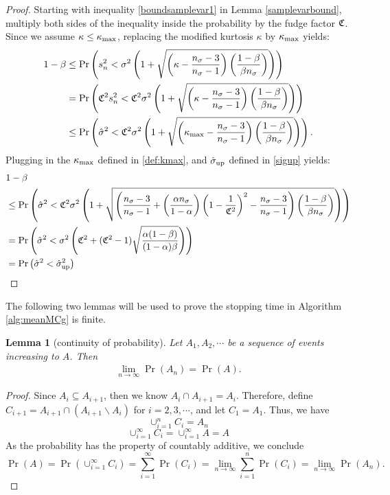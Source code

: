 \documentclass{iitthesis}
\newtheorem{lemma}[theorem]{Lemma}
\theoremstyle{definition}
\begin{document}
\begin{proof}
Starting with inequality \eqref{boundsamplevar1} in Lemma \ref{samplevarbound}, multiply both sides of the inequality inside the probability by the fudge factor $\mathfrak{C}$. Since we assume $\kappa \leq \kappa_{\max}$,  replacing the modified kurtosis $\kappa$ by $\kappa_{\max}$ yields:
\begin{align*}
1-\beta &\leq \Pr\left( s_n^2 < \sigma^2 \left (1+\sqrt{\left (\kappa-\frac{n_{\sigma}-3}{n_{\sigma}-1}\right)\left (\frac{1-\beta}{\beta n_{\sigma}}\right )}\right)\right)\\&
 = \Pr\left( \mathfrak{C}^2 s_n^2 < \mathfrak{C}^2 \sigma^2 \left (1+\sqrt{\left (\kappa-\frac{n_{\sigma}-3}{n_{\sigma}-1}\right)\left (\frac{1-\beta}{\beta n_{\sigma}}\right )}\right)\right)\\&
 \leq \Pr\left( \hat{\sigma}^2 < \mathfrak{C}^2 \sigma^2 \left (1+\sqrt{\left (\kappa_{\max}-\frac{n_{\sigma}-3}{n_{\sigma}-1}\right)\left (\frac{1-\beta}{\beta n_{\sigma}}\right )}\right)\right).
 \end{align*}
Plugging in the $\kappa_{\max}$ defined in \eqref{def:kmax}, and $\hat{\sigma}_{\operatorname{up}}$ defined in \eqref{sigup} yields:
\begin{align*}
&1-\beta \\
&\leq \Pr\left( \hat{\sigma}^2 < \mathfrak{C}^2 \sigma^2 \left (1+\sqrt{\left (\frac{n_{\sigma}-3}{n_{\sigma}-1} + \left(\frac{ \alpha n_{\sigma}}{1-\alpha}\right) \left(1 - \frac{1}{\mathfrak{C}^2}\right)^2- \frac{n_{\sigma}-3}{n_{\sigma}-1}\right)\left (\frac{1-\beta}{\beta n_{\sigma}}\right )}\right)\right)\\
& = \Pr\left( \hat{\sigma}^2 < \sigma^2 \left(\mathfrak{C}^2+(\mathfrak{C}^2-1)\sqrt{\frac{\alpha(1-\beta)}{(1-\alpha)\beta}}\right)\right)\\
& =\Pr \left ( \hat{\sigma}^2< \hat{\sigma}_{\operatorname{up}}^2 \right)
\end{align*}
\end{proof}
The following two lemmas will be used to prove the stopping time in Algorithm \ref{alg:meanMCg} is finite.
\begin{lemma}[continuity of probability]\label{contiofprob}
Let $A_1, A_2, \cdots$ be a sequence of events increasing to $A$. Then
\begin{align}
\lim_{n \to \infty}\Pr(A_n) =\Pr(A).
\end{align}
\end{lemma}
\begin{proof}
Since $A_i \subseteq A_{i+1}$, then we know $A_i \cap A_{i+1} = A_i$. Therefore, define $C_{i+1} = A_{i+1} \cap (A_{i+1}\backslash A_i)$ for $i = 2,3,\cdots$, and let $C_1 = A_1$. Thus, we have
$$\cup_{i=1}^n C_i = A_n$$
$$\cup_{i=1}^\infty C_i=\cup_{i=1}^\infty A=A$$
As the probability has the property of countably additive, we conclude
$$\Pr (A) = \Pr (\cup_{i=1}^\infty C_i) = \sum_{i=1}^\infty \Pr(C_i) =  \lim_{n \to \infty}\sum_{i=1}^n\Pr(C_i)=\lim_{n\to \infty}\Pr(A_n).$$
\end{proof}
\end{document}
